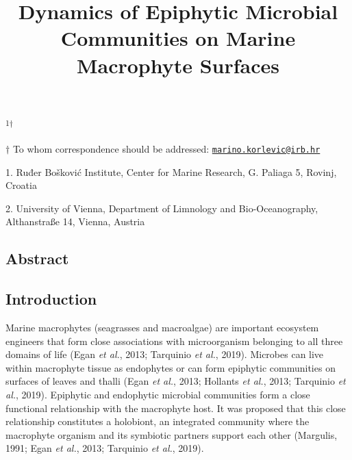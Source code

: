 \documentclass[12pt,]{article}
\title{\textbf{Dynamics of Epiphytic Microbial Communities on Marine Macrophyte
Surfaces}}
\author{}
\date{}
\begin{document}
\maketitle

\vspace{70mm}

\textsuperscript{1\(\dagger\)}

\vspace{40mm}

\(\dagger\) To whom correspondence should be addressed:
\href{mailto:marino.korlevic@irb.hr}{\nolinkurl{marino.korlevic@irb.hr}}

1. Ruđer Bošković Institute, Center for Marine Research, G. Paliaga 5,
Rovinj, Croatia

2. University of Vienna, Department of Limnology and Bio-Oceanography,
Althanstraße 14, Vienna, Austria \newpage \linenumbers
{} \setlength\parindent{24pt}

\hypertarget{abstract}{%
\subsection{Abstract}\label{abstract}}

\newpage

\hypertarget{introduction}{%
\subsection{Introduction}\label{introduction}}

Marine macrophytes (seagrasses and macroalgae) are important ecosystem
engineers that form close associations with microorganism belonging to
all three domains of life (Egan \emph{et al.}, 2013; Tarquinio \emph{et
al.}, 2019). Microbes can live within macrophyte tissue as endophytes or
can form epiphytic communities on surfaces of leaves and thalli (Egan
\emph{et al.}, 2013; Hollants \emph{et al.}, 2013; Tarquinio \emph{et
al.}, 2019). Epiphytic and endophytic microbial communities form a close
functional relationship with the macrophyte host. It was proposed that
this close relationship constitutes a holobiont, an integrated community
where the macrophyte organism and its symbiotic partners support each
other (Margulis, 1991; Egan \emph{et al.}, 2013; Tarquinio \emph{et
al.}, 2019).
\end{document}
